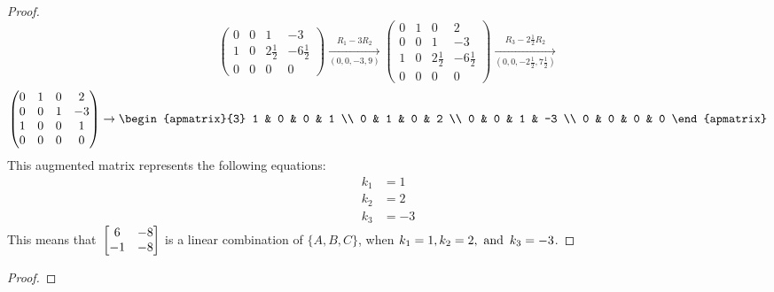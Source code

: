\documentclass{article}
\begin{document}
\begin{enumerate}
\begin{proof}
\[\begin{pmatrix}
                0 & 0 & 1            & -3            \\
                1 & 0 & 2\frac{1}{2} & -6\frac{1}{2} \\
                0 & 0 & 0            & 0
            \end{pmatrix} \xrightarrow[(0,0,-3,9)]{R_1 - 3R_2}
            \begin{pmatrix}
                0 & 1 & 0            & 2             \\
                0 & 0 & 1            & -3            \\
                1 & 0 & 2\frac{1}{2} & -6\frac{1}{2} \\
                0 & 0 & 0            & 0
            \end{pmatrix} \xrightarrow[(0,0,-2\frac{1}{2}, 7\frac{1}{2})]{R_3 - 2\frac{1}{2}R_2}
        \]
        \[
            \begin{pmatrix}
                0 & 1 & 0 & 2  \\
                0 & 0 & 1 & -3 \\
                1 & 0 & 0 & 1  \\
                0 & 0 & 0 & 0
            \end{pmatrix} \rightarrow
            \begin{apmatrix}{3}
                1 & 0 & 0 & 1  \\
                0 & 1 & 0 & 2  \\
                0 & 0 & 1 & -3 \\
                0 & 0 & 0 & 0
            \end{apmatrix}
        \]
        This augmented matrix represents the following equations:
        \begin{align*}
            k_1 & = 1  \\
            k_2 & = 2  \\
            k_3 & = -3
        \end{align*}
        This means that $\operatorname{\displaystyle} \begin{bmatrix} 6 & -8 \\ -1 & -8 \end{bmatrix}$ is a linear combination of $\{A,B,C\}$, when $k_1 = 1, k_2 = 2, \operatorname{~\text{and}~} k_3 = -3$.
    \end{proof}
    \begin{proof}

\end{proof}
\end{enumerate}
\end{document}
